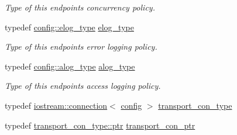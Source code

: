 \begin{DoxyCompactItemize}
\begin{DoxyCompactList}\small\item\em Type of this endpoint\textquotesingle{}s concurrency policy. \end{DoxyCompactList}\item 
typedef \hyperlink{classwebsocketpp_1_1log_1_1stub}{config\+::elog\+\_\+type} \hyperlink{classwebsocketpp_1_1transport_1_1iostream_1_1endpoint_a0aafebd80866c13bef4caa45e48a8ede}{elog\+\_\+type}\hypertarget{classwebsocketpp_1_1transport_1_1iostream_1_1endpoint_a0aafebd80866c13bef4caa45e48a8ede}{}\label{classwebsocketpp_1_1transport_1_1iostream_1_1endpoint_a0aafebd80866c13bef4caa45e48a8ede}

\begin{DoxyCompactList}\small\item\em Type of this endpoint\textquotesingle{}s error logging policy. \end{DoxyCompactList}\item 
typedef \hyperlink{classwebsocketpp_1_1log_1_1stub}{config\+::alog\+\_\+type} \hyperlink{classwebsocketpp_1_1transport_1_1iostream_1_1endpoint_af176dc3a44caefab71de271c27873c81}{alog\+\_\+type}\hypertarget{classwebsocketpp_1_1transport_1_1iostream_1_1endpoint_af176dc3a44caefab71de271c27873c81}{}\label{classwebsocketpp_1_1transport_1_1iostream_1_1endpoint_af176dc3a44caefab71de271c27873c81}

\begin{DoxyCompactList}\small\item\em Type of this endpoint\textquotesingle{}s access logging policy. \end{DoxyCompactList}\item 
typedef \hyperlink{classwebsocketpp_1_1transport_1_1iostream_1_1connection}{iostream\+::connection}$<$ \hyperlink{classconfig}{config} $>$ \hyperlink{classwebsocketpp_1_1transport_1_1iostream_1_1endpoint_a01827f94c5d01289975146f0438ee79b}{transport\+\_\+con\+\_\+type}
\item 
typedef \hyperlink{classwebsocketpp_1_1transport_1_1iostream_1_1connection_a054436e87f6dc4404b13f6131707d2ab}{transport\+\_\+con\+\_\+type\+::ptr} \hyperlink{classwebsocketpp_1_1transport_1_1iostream_1_1endpoint_a709bba4a4e1e2b7829abe4aa55de8078}{transport\+\_\+con\+\_\+ptr}
\end{DoxyCompactItemize}
